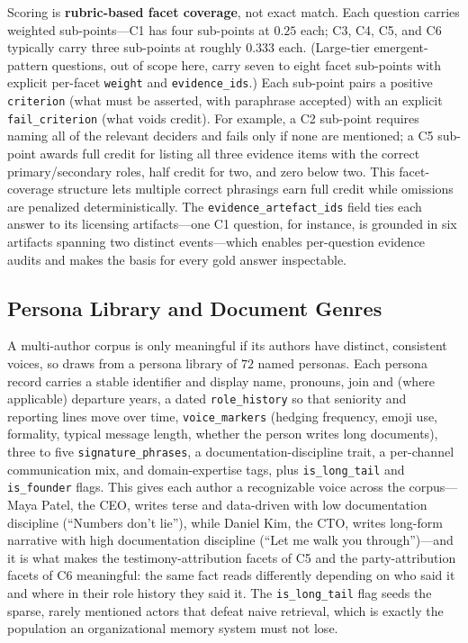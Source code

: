 Scoring is \textbf{rubric-based facet coverage}, not exact match. Each question
carries weighted sub-points---C1 has four sub-points at $0.25$ each; C3, C4, C5,
and C6 typically carry three sub-points at roughly $0.333$ each. (Large-tier
emergent-pattern questions, out of scope here, carry seven to eight facet
sub-points with explicit per-facet \texttt{weight} and \texttt{evidence\_ids}.)
Each sub-point pairs a positive
\texttt{criterion} (what must be asserted, with paraphrase accepted) with an
explicit \texttt{fail\_criterion} (what voids credit). For example, a C2
sub-point requires naming all of the relevant deciders and fails only if none are
mentioned; a C5 sub-point awards full credit for listing all three evidence items
with the correct primary/secondary roles, half credit for two, and zero below
two. This facet-coverage structure lets multiple correct phrasings earn full
credit while omissions are penalized deterministically. The
\texttt{evidence\_artefact\_ids} field ties each answer to its licensing
artifacts---one C1 question, for instance, is grounded in six artifacts spanning
two distinct events---which enables per-question evidence audits and makes the
basis for every gold answer inspectable.

\subsection{Persona Library and Document Genres}
\label{sec:design:personas}

A multi-author corpus is only meaningful if its authors have distinct, consistent
voices, so \bench{} draws from a persona library of $72$ named personas. Each
persona record carries a stable identifier and display name, pronouns, join and
(where applicable) departure years, a dated \texttt{role\_history} so that
seniority and reporting lines move over time, \texttt{voice\_markers} (hedging
frequency, emoji use, formality, typical message length, whether the person
writes long documents), three to five \texttt{signature\_phrases}, a
documentation-discipline trait, a per-channel communication mix, and
domain-expertise tags, plus \texttt{is\_long\_tail} and \texttt{is\_founder}
flags. This gives each author a recognizable voice across the corpus---Maya
Patel, the CEO, writes terse and data-driven with low documentation discipline
(``Numbers don't lie''), while Daniel Kim, the CTO, writes long-form narrative
with high documentation discipline (``Let me walk you through'')---and it is what
makes the testimony-attribution facets of C5 and the party-attribution facets of
C6 meaningful: the same fact reads differently depending on who said it and where
in their role history they said it. The \texttt{is\_long\_tail} flag seeds the
sparse, rarely mentioned actors that defeat naive retrieval, which is exactly the
population an organizational memory system must not lose.

